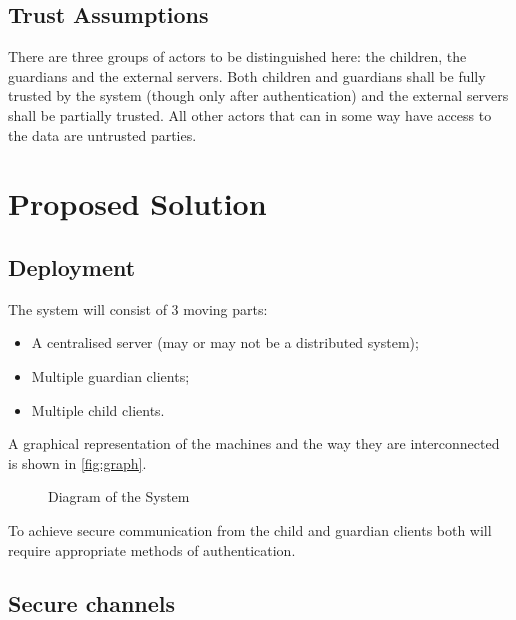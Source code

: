 \documentclass[a4paper]{article}
\begin{document}
\subsection{Trust Assumptions}
There are three groups of actors to be distinguished here: the children, the guardians and the
external servers. Both children and guardians shall be fully trusted by the system (though only
after authentication) and the external servers shall be partially trusted. All other actors that can
in some way have access to the data are untrusted parties.

\section{Proposed Solution}

\subsection{Deployment}

The system will consist of 3 moving parts:

\begin{itemize}
    \item A centralised server (may or may not be a distributed system);
    \item Multiple guardian clients;
    \item Multiple child clients.
\end{itemize}

A graphical representation of the machines and the way they are interconnected is shown in
\autoref{fig:graph}.

\begin{figure}
    \centering
    
    \caption{Diagram of the System}\label{fig:graph}
\end{figure}

To achieve secure communication from the child and guardian clients both will require appropriate
methods of authentication.

\subsection{Secure channels}
\end{document}
